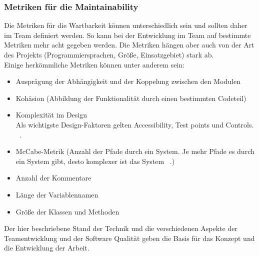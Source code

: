 \subsubsection{Metriken für die Maintainability}
Die Metriken für die Wartbarkeit können unterschiedlich sein und sollten daher im Team definiert werden. So kann bei der Entwicklung im Team auf bestimmte Metriken mehr acht gegeben werden. Die Metriken hängen aber auch von der Art des Projekts (Programmiersprachen, Größe, Einsatzgebiet) stark ab. \\
Einige herkömmliche Metriken können unter anderem sein:

\begin{itemize} 
\item Ausprägung der Abhängigkeit und der Koppelung zwischen den Modulen 
\item Kohäsion (Abbildung der Funktionalität durch einen bestimmten Codeteil)
\item Komplexität im Design \\
Als wichtigste Design-Faktoren gelten Accessibility, Test points und Controls. ~\parencite{dhillonMaintainability}.
\item McCabe-Metrik (Anzahl der Pfade durch ein System. Je mehr Pfade es durch ein System gibt, desto komplexer ist das System ~\parencite{curtis1979measuring}.)
\item Anzahl der Kommentare
\item Länge der Variablennamen
\item Größe der Klassen und Methoden
\end{itemize}

Der hier beschriebene Stand der Technik und die verschiedenen Aspekte der Teamentwicklung und der Software Qualität geben die Basis für das Konzept und die Entwicklung der Arbeit.
\chapterend